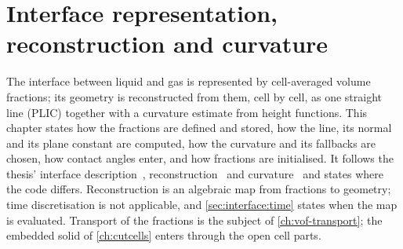 \chapter{Interface representation, reconstruction and curvature}\label{ch:interface}
The interface between liquid and gas is represented by cell-averaged volume
fractions; its geometry is reconstructed from them, cell by cell, as one
straight line (PLIC) together with a curvature estimate from height
functions. This chapter states how the fractions are defined and stored, how
the line, its normal and its plane constant are computed, how the curvature and
its fallbacks are chosen, how contact angles enter, and how fractions are
initialised. It follows the thesis' interface description~,
reconstruction~ and curvature~ and states where the
code differs. Reconstruction is an algebraic map from fractions to geometry;
time discretisation is not applicable, and \cref{sec:interface:time} states
when the map is evaluated. Transport of the fractions is the subject of
\cref{ch:vof-transport}; the embedded solid of \cref{ch:cutcells} enters
through the open cell parts.

